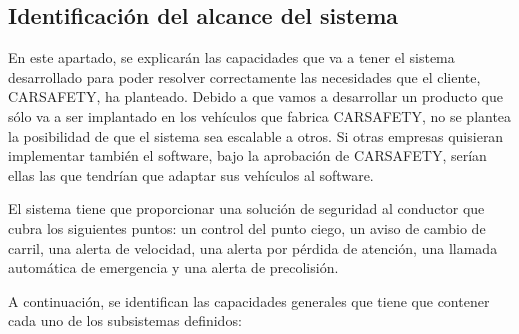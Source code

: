 \subsection {Identificación del alcance del sistema}
\par En este apartado, se explicarán las capacidades que va a tener el sistema desarrollado para poder resolver correctamente las necesidades que el cliente, CARSAFETY, ha planteado. Debido a que vamos a desarrollar un producto que sólo va a ser implantado en los vehículos que fabrica CARSAFETY, no se plantea la posibilidad de que el sistema sea escalable a otros. Si otras empresas quisieran implementar también el software, bajo la aprobación de CARSAFETY, serían ellas las que tendrían que adaptar sus vehículos al software.
\par El sistema tiene que proporcionar una solución de seguridad al conductor que cubra los siguientes puntos: un control del punto ciego, un aviso de cambio de carril, una alerta de velocidad, una alerta por pérdida de atención, una llamada automática de emergencia y una alerta de precolisión.
\par A continuación, se identifican las capacidades generales que tiene que contener cada uno de los subsistemas definidos:

